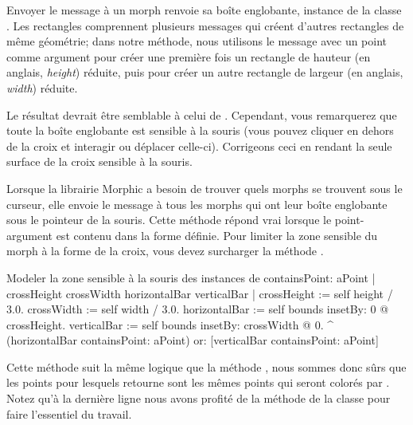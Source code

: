 \documentclass[a4paper,10pt,twoside]{book}
\begin{document}
Envoyer le message  à un morph renvoie sa
boîte englobante, instance de la classe .  Les
rectangles comprennent plusieurs messages qui créent d'autres
rectangles de même géométrie; %
dans notre méthode, nous utilisons le message  avec un
point comme argument pour créer une première fois un rectangle de
hauteur (en anglais, \emph{height}) réduite, puis pour créer un
autre rectangle de largeur (en anglais, \emph{width}) réduite.

Le résultat devrait être semblable à celui de .
Cependant, vous remarquerez que toute la boîte englobante est
sensible à la souris (vous pouvez cliquer en dehors de la croix et
interagir ou déplacer celle-ci). Corrigeons ceci en rendant la seule
surface de la croix sensible à la souris.

Lorsque la librairie Morphic a besoin de trouver quels morphs se
trouvent sous le curseur, elle envoie le message 
 à tous les morphs qui ont leur boîte englobante sous le
pointeur de la souris. 
Cette méthode répond vrai lorsque le point-argument est contenu dans la
forme définie.
Pour limiter la zone sensible du morph à la forme de la croix, vous
devez surcharger la méthode .


\begin{method}[firstContains]{Modeler la zone sensible à la souris des instances de }
containsPoint: aPoint
	| crossHeight crossWidth horizontalBar verticalBar |
	crossHeight := self height / 3.0.
	crossWidth := self width / 3.0.
	horizontalBar := self bounds insetBy: 0 @ crossHeight.
	verticalBar := self bounds insetBy: crossWidth @ 0.
	^ (horizontalBar containsPoint: aPoint)
		or: [verticalBar containsPoint: aPoint]
\end{method}

Cette méthode suit la même logique que la méthode , 
nous sommes donc sûrs que les points pour lesquels
 retourne  sont les mêmes points qui
seront colorés par .
Notez qu'à 
la dernière ligne
nous avons profité de la méthode
de la classe  pour faire l'essentiel du travail.
\end{document}
